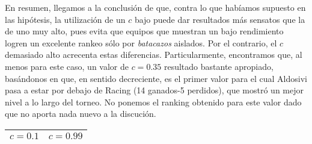 En resumen, llegamos a la conclusión de que, contra lo que habíamos supuesto en las hipótesis, la utilización de un $c$ bajo puede dar resultados más sensatos que la de uno muy alto, pues evita que equipos que muestran un bajo rendimiento logren un excelente rankeo sólo por \emph{batacazos} aislados. Por el contrario, el $c$ demasiado alto acrecenta estas diferencias. Particularmente, encontramos que, al menos para este caso, un valor de $c=0.35$ resultado bastante apropiado, basándonos en que, en sentido decreciente, es el primer valor para el cual Aldosivi pasa a estar por debajo de Racing (14 ganados-5 perdidos), que mostró un mejor nivel a lo largo del torneo. No ponemos el ranking obtenido para este valor dado que no aporta nada nuevo a la discución.

\begin{table}[H]
	\center
	\begin{flushright}
	\begin{tabular}{| m{} || m{} |}
		\rowcolor{LightCyan}
		\hline $c=0.1$ & $c=0.99$ \\ \hline
	\end{tabular}


\end{flushright}
\end{table}

